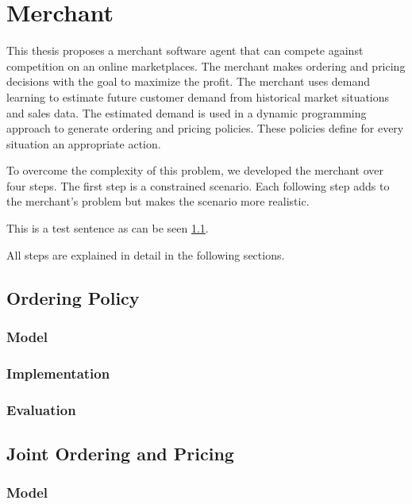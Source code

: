 \chapter{Merchant}
This thesis proposes a merchant software agent that can compete against competition on an online marketplaces.
The merchant makes ordering and pricing decisions with the goal to maximize the profit.
The merchant uses demand learning to estimate future customer demand from historical market situations and sales data.
The estimated demand is used in a dynamic programming approach to generate ordering and pricing policies.
These policies define for every situation an appropriate action.

To overcome the complexity of this problem, we developed the merchant over four steps.
The first step is a constrained scenario.
Each following step adds to the merchant's problem but makes the scenario more realistic.

This is a test sentence as can be seen \cref{section:ordering_policy}.

All steps are explained in detail in the following sections.

\section{Ordering Policy}
\label{section:ordering_policy}
\subsection{Model}
\subsection{Implementation}
\subsection{Evaluation}

\section{Joint Ordering and Pricing}
\subsection{Model}
